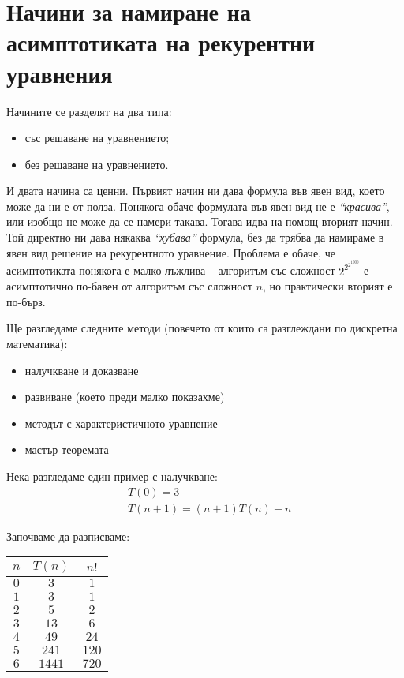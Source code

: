 \section{Начини за намиране на асимптотиката на рекурентни уравнения}

Начините се разделят на два типа:
\begin{itemize}
    \item със решаване на уравнението;
    \item без решаване на уравнението.
\end{itemize}

И двата начина са ценни.
Първият начин ни дава формула във явен вид, което може да ни е от полза.
Понякога обаче формулата във явен вид не е \textit{``красива''}, или изобщо не може да се намери такава.
Тогава идва на помощ вторият начин.
Той директно ни дава някаква \textit{``хубава''} формула, без да трябва да намираме в явен вид решение на рекурентното уравнение.
Проблема е обаче, че асимптотиката понякога е малко лъжлива -- алгоритъм със сложност $2^{2^{2^{1000}}}$ е асимптотично по-бавен от алгоритъм със сложност $n$, но практически вторият е по-бърз.

\newpage

Ще разгледаме следните методи (повечето от които са разглеждани по дискретна математика):
\begin{itemize}
    \item налучкване и доказване
    \item развиване (което преди малко показахме)
    \item методът с характеристичното уравнение
    \item мастър-теоремата
\end{itemize}

Нека разгледаме един пример с налучкване:
\begin{align*}
     & T(0) = 3                   \\
     & T(n + 1) = (n + 1)T(n) - n
\end{align*}

Започваме да разписваме:
\begin{center}
    \begin{tabular}{| c | c | c |}
        \hline
        $n$ & $T(n)$ & $n!$  \\
        \hline
        $0$ & $3$    & $1$   \\
        \hline
        $1$ & $3$    & $1$   \\
        \hline
        $2$ & $5$    & $2$   \\
        \hline
        $3$ & $13$   & $6$   \\
        \hline
        $4$ & $49$   & $24$  \\
        \hline
        $5$ & $241$  & $120$ \\
        \hline
        $6$ & $1441$ & $720$ \\
        \hline
    \end{tabular}
\end{center}

